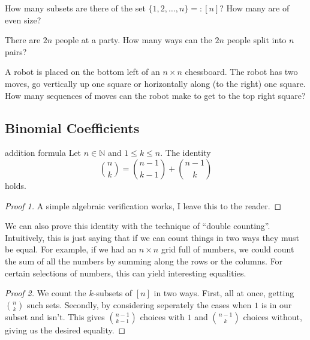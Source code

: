 \documentclass{article}
\begin{document}
\begin{exercise}[]{}
    How many subsets are there of the set $\{1, 2, \dots, n\} =: [n]$? How many are of even size?
\end{exercise}

\begin{exercise}[]{}
    There are $2n$ people at a party. How many ways can the $2n$ people split into $n$ pairs? 
\end{exercise}

\begin{exercise}[]{}
    A robot is placed on the bottom left of an $n \times n$ chessboard. The robot has two moves, go vertically up one square or 
    horizontally along (to the right) one square. How many sequences of moves can the robot make to get to the top right square?
\end{exercise}

\newpage

\subsection{Binomial Coefficients}

\begin{lemma}[]{addition formula}
    Let $n \in \mathbb{N}$ and $1 \leq k \leq n$. The identity \[\binom{n}{k} = \binom{n-1}{k-1} + \binom{n-1}{k}\] holds.
\end{lemma}

\begin{proof}[Proof 1]
    A simple algebraic verification works, I leave this to the reader.
\end{proof}

We can also prove this identity with the technique of ``double counting''. Intuitively, this is just saying that if we can count things in two 
ways they must be equal. For example, if we had an $n \times n$ grid full of numbers, we could count the sum of all the numbers by summing along 
the rows or the columns. For certain selections of numbers, this can yield interesting equalities.  

\begin{proof}[Proof 2]
    We count the $k$-subsets of $[n]$ in two ways. First, all at once, getting $\binom{n}{k}$ such sets. Secondly, by considering seperately the 
    cases when $1$ is in our subset and isn't. This gives $\binom{n-1}{k-1}$ choices with $1$ and $\binom{n-1}{k}$ choices without, giving us the 
    desired equality. 
\end{proof}
\end{document}
